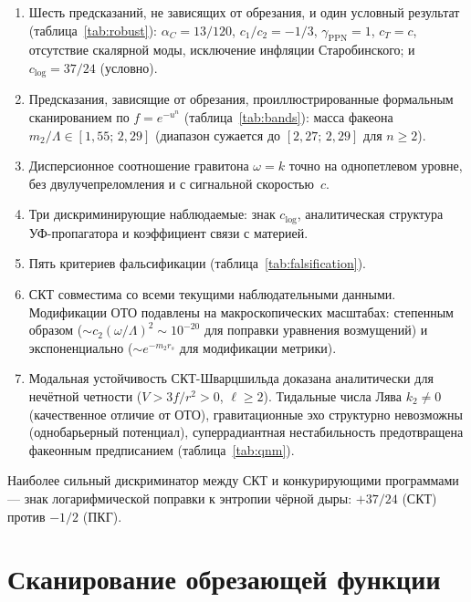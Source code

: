 \documentclass[12pt,a4paper]{article}
\theoremstyle{plain}
\theoremstyle{definition}
\theoremstyle{remark}
\begin{document}
\begin{enumerate}[(1)]
\item Шесть предсказаний, не зависящих от обрезания, и один
  условный результат (таблица~\ref{tab:robust}): $\alpha_C = 13/120$,
  $c_1/c_2 = -1/3$, $\gamma_{\mathrm{PPN}} = 1$,
  $c_T = c$, отсутствие скалярной моды, исключение инфляции
  Старобинского; и $c_{\log} = 37/24$ (условно).

\item Предсказания, зависящие от обрезания, проиллюстрированные
  формальным сканированием по $f = e^{-u^n}$
  (таблица~\ref{tab:bands}): масса факеона
  $m_2/\Lambda \in [1{,}55;\, 2{,}29]$ (диапазон сужается до
  $[2{,}27;\, 2{,}29]$ для $n \geq 2$).

\item Дисперсионное соотношение гравитона $\omega = k$ точно на
  однопетлевом уровне, без двулучепреломления и с сигнальной
  скоростью~$c$.

\item Три дискриминирующие наблюдаемые: знак $c_{\log}$,
  аналитическая структура УФ-пропагатора и коэффициент связи
  с материей.

\item Пять критериев фальсификации
  (таблица~\ref{tab:falsification}).

\item СКТ совместима со всеми текущими наблюдательными данными.
  Модификации ОТО подавлены на макроскопических масштабах:
  степенным образом ($\sim c_2(\omega/\Lambda)^2 \sim 10^{-20}$
  для поправки уравнения возмущений) и экспоненциально
  ($\sim e^{-m_2 r_s}$ для модификации метрики).

\item Модальная устойчивость СКТ-Шварцшильда доказана
  аналитически для нечётной четности ($V > 3f/r^2 > 0$,
  $\ell \geq 2$). Тидальные числа Лява $k_2 \neq 0$
  (качественное отличие от ОТО), гравитационные эхо структурно
  невозможны (однобарьерный потенциал), суперрадиантная
  нестабильность предотвращена факеонным предписанием
  (таблица~\ref{tab:qnm}).
\end{enumerate}

Наиболее сильный дискриминатор между СКТ и конкурирующими
программами --- знак логарифмической поправки к энтропии чёрной
дыры: $+37/24$ (СКТ) против $-1/2$ (ПКГ).

\appendix
\section{Сканирование обрезающей функции}
\label{app:cutoff}
\end{document}
